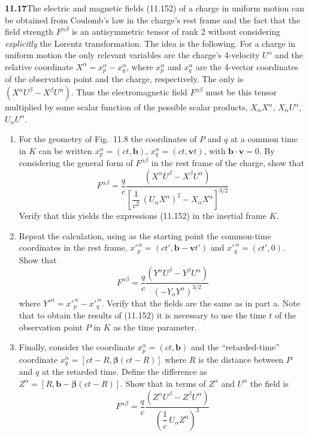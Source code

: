 \par\bigskip
\noindent\textbf{11.17}\quad The electric and magnetic fields (11.152) of a charge in uniform motion can be obtained from Coulomb's law in the charge's rest frame and the fact that the field strength $F^{\alpha\beta}$ is an antisymmetric tensor of rank 2 without considering \emph{explicitly} the Lorentz transformation. The idea is the following. For a charge in uniform motion the only relevant variables are the charge's 4-velocity $U^{\alpha}$ and the relative coordinate $X^{\alpha}=x^{\alpha}_{p}-x^{\alpha}_{q}$, where $x^{\alpha}_{p}$ and $x^{\alpha}_{q}$ are the 4-vector coordinates of the observation point and the charge, respectively. The only  is $(X^{\alpha}U^{\beta}-X^{\beta}U^{\alpha})$.  Thus the electromagnetic field $F^{\alpha\beta}$ must be this tensor multiplied by some scalar function of the possible scalar products, $X_{\alpha}X^{\alpha}$, $X_{\alpha}U^{\alpha}$, $U_{\alpha}U^{\alpha}$.
\begin{enumerate}
\item[(a)] For the geometry of Fig.~11.8 the coordinates of $P$ and $q$ at a common time in $K$ can be written $x^{\alpha}_{p}=(ct,\mathbf{b})$, $x^{\alpha}_{q}=(ct,\mathbf{v}t)$, with $\mathbf{b}\cdot\mathbf{v}=0$. By considering the general form of $F^{\alpha\beta}$ in the rest frame of the charge, show that
\[
F^{\alpha\beta}=\frac{q}{c}\frac{(X^{\alpha}U^{\beta}-X^{\beta}U^{\alpha})}{\left[\dfrac{1}{c^{2}}\,(U_{\alpha}X^{\alpha})^{2}-X_{\alpha}X^{\alpha}\right]^{3/2}}
\]
Verify that this yields the expressions (11.152) in the inertial frame $K$.
\item[(b)] Repeat the calculation, using as the starting point the common-time coordinates in the rest frame, $x'^{\,\alpha}_{p}=(ct',\mathbf{b}-\mathbf{v}t')$ and $x'^{\,\alpha}_{q}=(ct',0)$. Show that
\[
F^{\alpha\beta}=\frac{q}{c}\frac{(Y^{\alpha}U^{\beta}-Y^{\beta}U^{\alpha})}{(-Y_{\alpha}Y^{\alpha})^{3/2}}
\]
where $Y'^{\alpha}=x'^{\,\alpha}_{p}-x'^{\,\alpha}_{q}$. Verify that the fields are the same as in part a. Note that to obtain the results of (11.152) it is necessary to use the time $t$ of the observation point $P$ in $K$ as the time parameter.
\item[(c)] Finally, consider the coordinate $x^{\alpha}_{p}=(ct,\mathbf{b})$ and the ``retarded-time'' coordinate $x^{\alpha}_{q}=[ct-R,\boldsymbol{\beta}(ct-R)]$ where $R$ is the distance between $P$ and $q$ at the retarded time. Define the difference as $Z^{\alpha}=[R,\mathbf{b}-\boldsymbol{\beta}(ct-R)]$. Show that in terms of $Z^{\alpha}$ and $U^{\alpha}$ the field is
\[
F^{\alpha\beta}=\frac{q}{c}\frac{(Z^{\alpha}U^{\beta}-Z^{\beta}U^{\alpha})}{\left(\dfrac{1}{c}\,U_{\alpha}Z^{\alpha}\right)^{3}}
\]
\end{enumerate}

